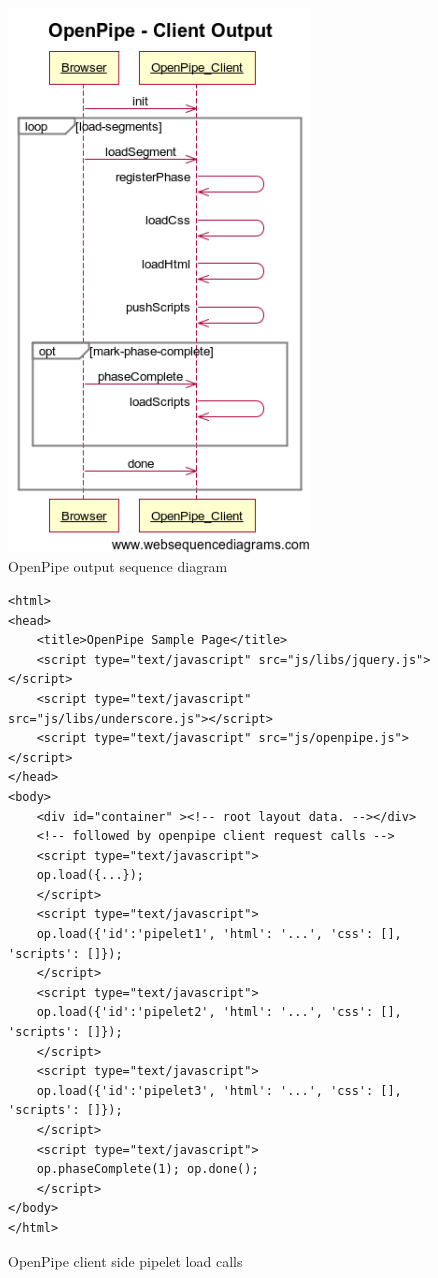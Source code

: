\documentclass[12pt]{report}
\begin{document}
\begin{figure}[H]
\caption{OpenPipe output sequence diagram}
\label{fig:openPipeClientOutputSequenceDiagram}
\centering
\includegraphics[width=80mm]{figures/images/openpipe_clientoutput.png}
\end{figure}

\begin{figure}[H]
\caption{OpenPipe client side pipelet load calls}
\label{fig:openPipeClientPipeletLoadCalls}
\begin{lstlisting}
<html>
<head>
	<title>OpenPipe Sample Page</title>
	<script type="text/javascript" src="js/libs/jquery.js"></script>
	<script type="text/javascript" src="js/libs/underscore.js"></script>
	<script type="text/javascript" src="js/openpipe.js"></script>
</head>
<body>
	<div id="container" ><!-- root layout data. --></div>
	<!-- followed by openpipe client request calls -->
	<script type="text/javascript">
	op.load({...});
	</script>
	<script type="text/javascript">
	op.load({'id':'pipelet1', 'html': '...', 'css': [], 'scripts': []});
	</script>
	<script type="text/javascript">
	op.load({'id':'pipelet2', 'html': '...', 'css': [], 'scripts': []});
	</script>
	<script type="text/javascript">
	op.load({'id':'pipelet3', 'html': '...', 'css': [], 'scripts': []});
	</script>
	<script type="text/javascript">
	op.phaseComplete(1); op.done();
	</script>
</body>
</html>
\end{lstlisting}
\end{figure}
\end{document}
